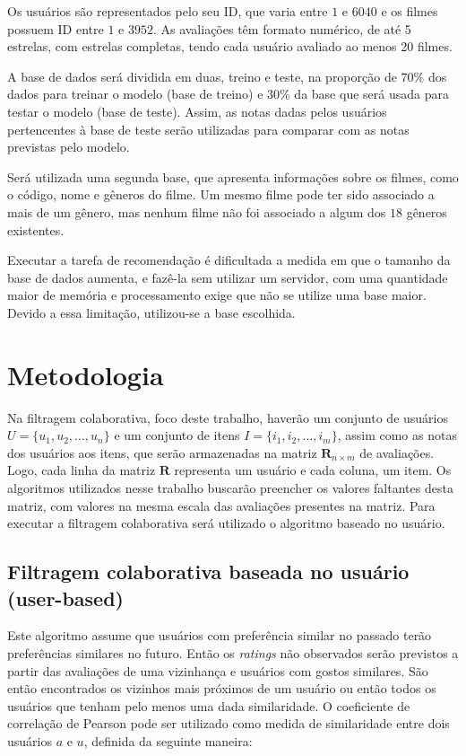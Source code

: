 \documentclass[12pt,a4paper,header]{abnt}
\begin{document}
Os usuários são representados pelo seu ID, que varia entre $1$ e $6040$ e os filmes possuem ID entre $1$ e $3952$. As avaliações têm formato numérico, de até 5 estrelas, com estrelas completas, tendo cada usuário avaliado ao menos 20 filmes.

A base de dados será dividida em duas, treino e teste, na proporção de $70\%$ dos dados para treinar o modelo (base de treino) e $30\%$ da base que será usada para testar o modelo (base de teste). Assim, as notas dadas pelos usuários pertencentes à base de teste serão utilizadas para comparar com as notas previstas pelo modelo.

Será utilizada uma segunda base, que apresenta informações sobre os filmes, como o código, nome e gêneros do filme. Um mesmo filme pode ter sido associado a mais de um gênero, mas nenhum filme não foi associado a algum dos $18$ gêneros existentes.

Executar a tarefa de recomendação é dificultada a medida em que o tamanho da base de dados aumenta, e fazê-la sem utilizar um servidor, com uma quantidade maior de memória e processamento exige que não se utilize uma base maior. Devido a essa limitação, utilizou-se a base escolhida. 

\section{Metodologia}

Na filtragem colaborativa, foco deste trabalho, haverão um conjunto de usuários $U = \{u_1, u_2, \ldots, u_n\}$ e um conjunto de itens $I = \{i_1, i_2, \ldots, i_m \}$, assim como as notas dos usuários aos itens, que serão armazenadas na matriz $\boldsymbol{R}_{n \times m}$ de avaliações\cite{hahsler2015recommenderlab}. Logo, cada linha da matriz $\boldsymbol{R}$ representa um usuário e cada coluna, um item. Os algoritmos utilizados nesse trabalho buscarão preencher os valores faltantes desta matriz, com valores na mesma escala das avaliações presentes na matriz\cite{takahashi2015estudo}. Para executar a filtragem colaborativa será utilizado o algoritmo baseado no usuário.

\subsection{Filtragem colaborativa baseada no usuário (user-based)}

Este algoritmo assume que usuários com preferência similar no passado terão preferências similares no futuro. Então os \textit{ratings} não observados serão previstos a partir das avaliações de uma vizinhança e usuários com gostos similares\cite{hahsler2015recommenderlab}. São então encontrados os vizinhos mais próximos de um usuário ou então todos os usuários que tenham pelo menos uma dada similaridade. O coeficiente de correlação de Pearson pode ser utilizado como medida de similaridade entre dois usuários $a$ e $u$, definida da seguinte maneira\cite{melville2011recommender}:
\end{document}
